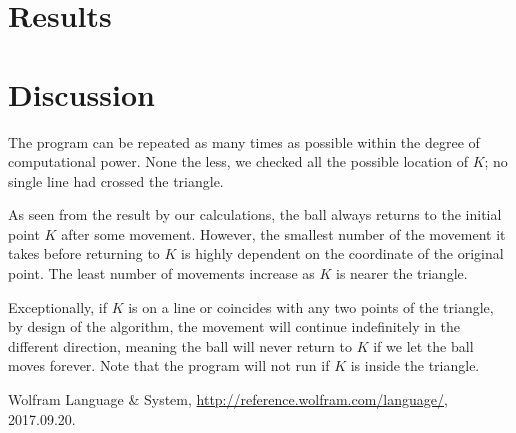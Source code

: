\documentclass[11pt,a4paper]{article}
\begin{document}
\section{Results}



\section{Discussion}
The program can be repeated as many times as possible within the degree of computational power. None the less, we checked all the possible location of \(K\); no single line had crossed the triangle.

As seen from the result by our calculations, the ball always returns to the initial point \(K\) after some movement. However, the smallest number of the movement it takes before returning to \(K\) is highly dependent on the coordinate of the original point. The least number of movements increase as \(K\) is nearer the triangle.

Exceptionally, if \(K\) is on a line or coincides with any two points of the triangle, by design of the algorithm, the movement will continue indefinitely in the different direction, meaning the ball will never return to \(K\) if we let the ball moves forever. Note that the program will not run if \(K\) is inside the triangle.

\begin{thebibliography}{99}

 Wolfram Language \& System, \url{http://reference.wolfram.com/language/}, 2017.09.20.


\end{thebibliography}
\end{document}
